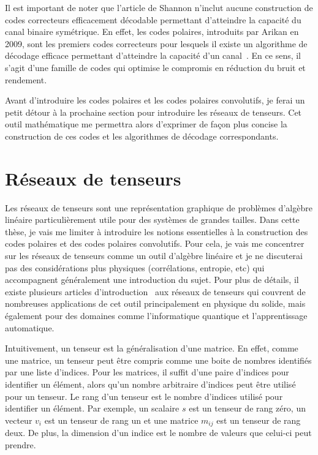 Il est important de noter que l'article de Shannon n'inclut aucune construction de codes 
correcteurs efficacement décodable permettant d'atteindre la capacité du canal binaire symétrique.
En effet, les codes polaires, introduits par Arikan en 2009,
sont les premiers codes correcteurs pour lesquels 
il existe un algorithme de décodage efficace permettant d'atteindre 
la capacité d'un canal~\cite{arikan_channel_2009}. 
En ce sens, il s'agit d'une famille de codes qui optimise le compromis en réduction du bruit 
et rendement.

Avant d'introduire les codes polaires et les codes polaires convolutifs,
je ferai un petit détour à la prochaine section pour introduire les réseaux de tenseurs.
Cet outil mathématique me permettra alors d'exprimer de façon plus concise la construction
de ces codes et les algorithmes de décodage correspondants.

\section{Réseaux de tenseurs}
\label{sec:reseaux_tenseurs}

Les réseaux de tenseurs sont une représentation graphique de problèmes d'algèbre linéaire
particulièrement utile pour des systèmes de grandes tailles.
Dans cette thèse, 
je vais me limiter à introduire les notions essentielles à la construction des 
codes polaires et des codes polaires convolutifs.
Pour cela, 
je vais me concentrer sur les réseaux de tenseurs comme un outil d'algèbre linéaire 
et je ne discuterai pas des considérations plus physiques (corrélations, entropie, etc) 
qui accompagnent généralement une introduction du sujet.
Pour plus de détails,
il existe plusieurs articles d'introduction~\cite{bridgeman_hand-waving_2017, baker_methodes_2021} aux réseaux de tenseurs qui couvrent de nombreuses applications de cet outil principalement en physique du solide,
mais également pour des domaines comme l'informatique quantique et l'apprentissage automatique. 

Intuitivement, 
un tenseur est la généralisation d'une matrice.
En effet,
comme une matrice, 
un tenseur peut être compris comme une boite de nombres identifiés par une liste d'indices. 
Pour les matrices,
il suffit d'une paire d'indices pour identifier un élément,
alors qu'un nombre arbitraire d'indices peut être utilisé pour un tenseur. 
Le rang d'un tenseur est le nombre d'indices utilisé pour identifier un élément.
Par exemple, 
un scalaire $s$ est un tenseur de rang zéro, 
un vecteur $v_i$ est un tenseur de rang un 
et une matrice $m_{ij}$ est un tenseur de rang deux.
De plus,
la dimension d'un indice est le nombre de valeurs que celui-ci peut prendre.

